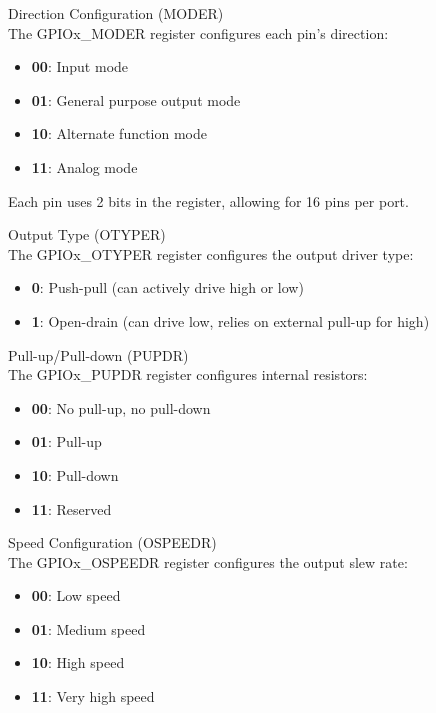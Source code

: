 \begin{definition}{Direction Configuration (MODER)}\\
The GPIOx\_MODER register configures each pin's direction:
\begin{itemize}
    \item \textbf{00}: Input mode
    \item \textbf{01}: General purpose output mode
    \item \textbf{10}: Alternate function mode
    \item \textbf{11}: Analog mode
\end{itemize}
Each pin uses 2 bits in the register, allowing for 16 pins per port.
\end{definition}

\begin{definition}{Output Type (OTYPER)}\\
The GPIOx\_OTYPER register configures the output driver type:
\begin{itemize}
    \item \textbf{0}: Push-pull (can actively drive high or low)
    \item \textbf{1}: Open-drain (can drive low, relies on external pull-up for high)
\end{itemize}
\end{definition}

\begin{definition}{Pull-up/Pull-down (PUPDR)}\\
The GPIOx\_PUPDR register configures internal resistors:
\begin{itemize}
    \item \textbf{00}: No pull-up, no pull-down
    \item \textbf{01}: Pull-up
    \item \textbf{10}: Pull-down
    \item \textbf{11}: Reserved
\end{itemize}
\end{definition}

\begin{definition}{Speed Configuration (OSPEEDR)}\\
The GPIOx\_OSPEEDR register configures the output slew rate:
\begin{itemize}
    \item \textbf{00}: Low speed
    \item \textbf{01}: Medium speed
    \item \textbf{10}: High speed
    \item \textbf{11}: Very high speed
\end{itemize}
\end{definition}

